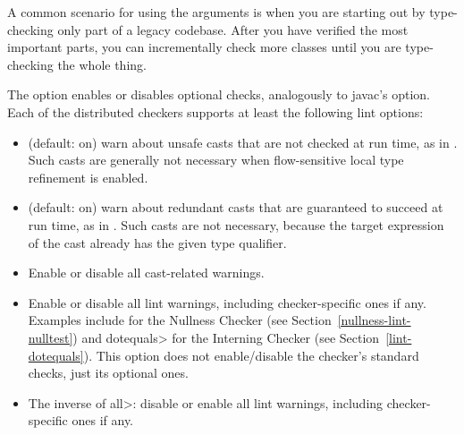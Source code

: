 A common scenario for using the arguments is when you are starting out by
type-checking only part of a legacy codebase.  After you have verified the
most important parts, you can incrementally check more classes until you
are type-checking the whole thing.



The  option enables or disables optional checks, analogously to
javac's  option.
Each of the distributed checkers supports at least the following lint options:




\begin{itemize}

\item
   (default: on) warn about unsafe casts that are not
  checked at run time, as in .  Such casts
  are generally not necessary when flow-sensitive local type refinement is
  enabled.

\item
   (default: on) warn about redundant
  casts that are guaranteed to succeed at run time,
  as in .  Such casts are not necessary,
  because the target expression of the cast already has the given type
  qualifier.

\item
   Enable or disable all cast-related warnings.

\item
\begin{sloppypar}
   Enable or disable all lint warnings, including
  checker-specific ones if any.  Examples include  for the
  Nullness Checker (see Section~\ref{nullness-lint-nulltest}) and \<dotequals> for
  the Interning Checker (see Section~\ref{lint-dotequals}).  This option
  does not enable/disable the checker's standard checks, just its optional
  ones.
\end{sloppypar}

\item
   The inverse of \<all>:  disable or enable all lint warnings,
  including checker-specific ones if any.

\end{itemize}

